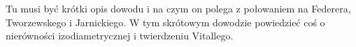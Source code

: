 {\color{red}
Tu musi być krótki opis dowodu i na czym on polega z połowaniem na Federera, Tworzewskego i Jarnickiego.
W tym skrótowym dowodzie powiedzieć coś o nierówności izodiametrycznej i twierdzeniu Vitallego.
}